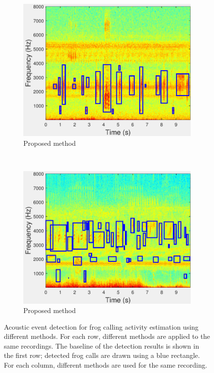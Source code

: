 \begin{figure}
                \begin{subfigure}[b]{0.35\textwidth}
       \includegraphics[width=\textwidth]{image/Ch7/AED_Jie.pdf}
                \caption{Proposed method}
        \end{subfigure}     
~
        \begin{subfigure}[b]{0.35\textwidth}
       \includegraphics[width=\textwidth]{image/Ch7/AED_Jie_2.pdf}
                \caption{Proposed method}
        \end{subfigure}                
        \caption[Acoustic event detection for frog abundance monitoring using different methods]{Acoustic event detection for frog calling activity estimation using different methods. For each row, different methods are applied to the same recordings. The baseline of the detection results is shown in the first row; detected frog calls are drawn using a blue rectangle. For each column, different methods are used for the same recording.}        
        \label{fig:Ch7_AED}
\end{figure}

